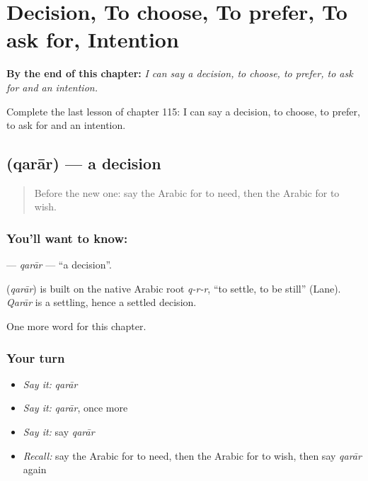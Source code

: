 
\chapter{Decision, To choose, To prefer, To ask for, Intention}
\label{ch:ar-decision-to-choose-to-prefer-to-ask-for-intention}

\begin{chapteropening}
\textbf{By the end of this chapter:} \emph{I can say a decision, to choose, to prefer, to ask for and an intention.}

Complete the last lesson of chapter 115: I can say a decision, to choose, to prefer, to ask for and an intention.
\end{chapteropening}

\section[\texorpdfstring{\ar{قرار} (qarār)}{قرار (qarār)}]{ (qarār) — a decision}

\label{lesson:AR-C115-qarar}



\begin{quote}
Before the new one: say the Arabic for to need, then the Arabic for to wish.
\end{quote}

\subsection*{You'll want to know: }
\textbf{} — \emph{qarār} — \textquotedblleft{}a decision\textquotedblright{}.

\begin{cousinweb}
\textbf{} (\emph{qarār}) is built on the native Arabic root \emph{q-r-r}, \textquotedblleft{}to settle, to be still\textquotedblright{} (Lane). \emph{Qarār} is a settling, hence a settled decision.
\end{cousinweb}

\begin{grammarlens}[title={What you've built}]
One more word for this chapter.
\end{grammarlens}

\subsection*{Your turn}
\begin{itemize}
\raggedright
  \item \emph{Say it:} \emph{qarār}
  \item \emph{Say it:} \emph{qarār}, once more
  \item \emph{Say it:} say \emph{qarār}
  \item \emph{Recall:} say the Arabic for to need, then the Arabic for to wish, then say \emph{qarār} again
\end{itemize}

